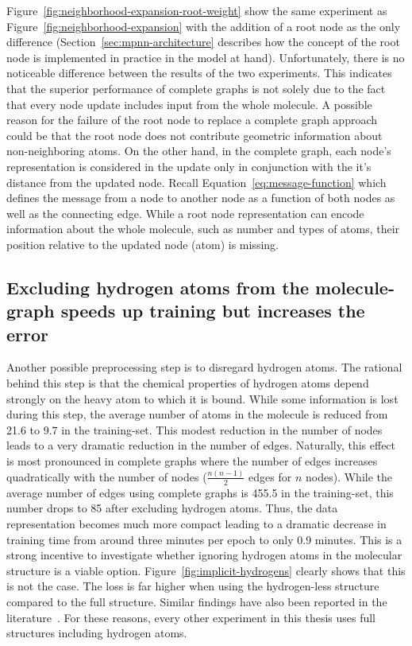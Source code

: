 Figure~\ref{fig:neighborhood-expansion-root-weight} show the same experiment as Figure~\ref{fig:neighborhood-expansion} with the addition of a root node as the only difference (Section~\ref{sec:mpnn-architecture} describes how the concept of the root node is implemented in practice in the model at hand). Unfortunately, there is no noticeable difference between the results of the two experiments. This indicates that the superior performance of complete graphs is not solely due to the fact that every node update includes input from the whole molecule. A possible reason for the failure of the root node to replace a complete graph approach could be that the root node does not contribute geometric information about non-neighboring atoms. On the other hand, in the complete graph, each node's representation is considered in the update only in conjunction with the it's distance from the updated node. Recall Equation~\ref{eq:message-function} which defines the message from a node to another node as a function of both nodes as well as the connecting edge. While a root node representation can encode information about the whole molecule, such as number and types of atoms, their position relative to the updated node (atom) is missing.


\subsection{Excluding hydrogen atoms from the molecule-graph speeds up training but increases the error}
\label{sec:no-hydrogens}

Another possible preprocessing step is to disregard hydrogen atoms. The rational behind this step is that the chemical properties of hydrogen atoms depend strongly on the heavy atom to which it is bound. While some information is lost during this step, the average number of atoms in the molecule is reduced from 21.6 to 9.7 in the training-set. This modest reduction in the number of nodes leads to a very dramatic reduction in the number of edges. Naturally, this effect is most pronounced in complete graphs where the number of edges increases quadratically with the number of nodes ($\frac{n(n - 1)}{2}$ edges for $n$ nodes). While the average number of edges using complete graphs is 455.5 in the training-set, this number drops to 85 after excluding hydrogen atoms. Thus, the data representation becomes much more compact leading to a dramatic decrease in training time from around three minutes per epoch to only 0.9 minutes. This is a strong incentive to investigate whether ignoring hydrogen atoms in the molecular structure is a viable option. Figure~\ref{fig:implicit-hydrogens} clearly shows that this is not the case. The loss is far higher when using the hydrogen-less structure compared to the full structure. Similar findings have also been reported in the literature~\cite{Gilmer2017}. For these reasons, every other experiment in this thesis uses full structures including hydrogen atoms.
%

